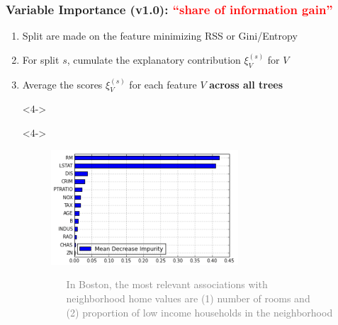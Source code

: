 \documentclass[xcolor={dvipsnames}]{beamer}
\begin{document}
\frame
{
\frametitle{Variable Importance (v1.0): \textcolor{red}{``share of information gain''}}
\begin{enumerate}
\item<1-> Split are made on the feature minimizing RSS or Gini/Entropy
\item<2-> For split $s$, cumulate the explanatory contribution $\xi_V^{(s)}$ for $V$ 
\item<3-> Average the scores $\xi_V^{(s)}$ for each feature $V$ \textbf{across all trees}
\item[]<4->
\item[]<4->
\begin{figure}
\centering
\includegraphics[width=2.75in]{stuffs/boston.png}

\footnotesize
\textcolor{gray}{
$\;\;\quad$In Boston, the most relevant associations with \\$\quad\;\;$neighborhood home values 
 are (1) number of rooms and \\$\;\;\quad$(2) proportion of low income households in the neighborhood }
\end{figure}

\end{enumerate}
}
\end{document}
